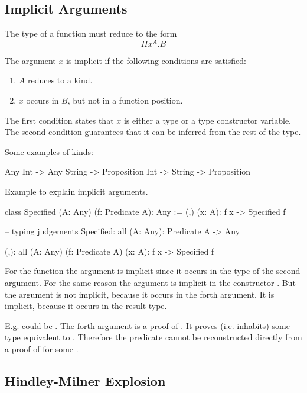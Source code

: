 \subsection{Implicit Arguments}


The type of a function must reduce to the form
$$
    \Pi x^A. B
$$

The argument $x$ is implicit if the following conditions are satisfied:

\begin{enumerate}

\item $A$ reduces to a kind.

\item $x$ occurs in $B$, but not in a function position.
\end{enumerate}

The first condition states that $x$ is either a type or a type constructor
variable. The second condition guarantees that it can be inferred from the rest
of the type.

\noindent Some examples of kinds:
\begin{alba}
    Any
    Int -> Any
    String -> Proposition
    Int -> String -> Proposition
\end{alba}


\noindent Example to explain implicit arguments.
\begin{alba}
class
    Specified (A: Any) (f: Predicate A): Any
:=
    (,) (x: A): f x -> Specified f

-- typing judgements
Specified: all (A: Any): Predicate A -> Any

(,): all (A: Any) (f: Predicate A) (x: A): f x -> Specified f
\end{alba}

For the function  the argument  is implicit since it
occurs in the type of the second argument. For the same reason the argument
 is implicit in the constructor \code{(,)}. But the argument  is
not implicit, because it occurs in the forth argument. It is implicit, because
it occurs in the result type.

E.g.  could be . The forth argument is a proof of
. It proves (i.e. inhabits) some type equivalent to
.  Therefore the predicate  cannot be
reconstructed directly from a proof of  for some .




\subsection{Hindley-Milner Explosion}

